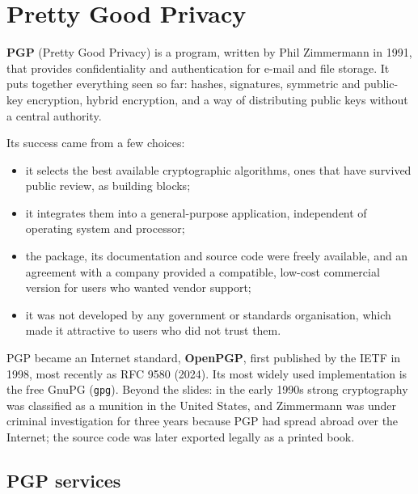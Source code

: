 \section{Pretty Good Privacy}
\label{sec:pgp}

\textbf{PGP} (Pretty Good Privacy) is a program, written by Phil Zimmermann in 1991, that provides confidentiality and authentication for e-mail and file storage. It puts together everything seen so far: hashes, signatures, symmetric and public-key encryption, hybrid encryption, and a way of distributing public keys without a central authority.

Its success came from a few choices:
\begin{itemize}
    \item it selects the best available cryptographic algorithms, ones that have survived public review, as building blocks;
    \item it integrates them into a general-purpose application, independent of operating system and processor;
    \item the package, its documentation and source code were freely available, and an agreement with a company provided a compatible, low-cost commercial version for users who wanted vendor support;
    \item it was not developed by any government or standards organisation, which made it attractive to users who did not trust them.
\end{itemize}
PGP became an Internet standard, \textbf{OpenPGP}, first published by the IETF in 1998, most recently as RFC 9580 (2024). Its most widely used implementation is the free GnuPG (\texttt{gpg}). Beyond the slides: in the early 1990s strong cryptography was classified as a munition in the United States, and Zimmermann was under criminal investigation for three years because PGP had spread abroad over the Internet; the source code was later exported legally as a printed book.

\subsection{PGP services}

